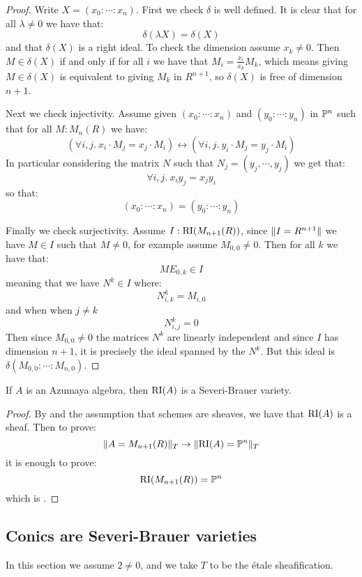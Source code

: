 \begin{proof}
Write $X=(x_0:\cdots:x_n)$. First we check $\delta$ is well defined. It is clear that for all $\lambda\not=0$ we have that:
\[\delta(\lambda X) = \delta(X)\]
and that $\delta(X)$ is a right ideal. To check the dimension assume $x_k\not=0$. Then $M\in\delta(X)$ if and only if for all $i$ we have that $M_i = \frac{x_i}{x_k} M_k$, which means giving $M\in\delta(X)$ is equivalent to giving $M_k$ in $R^{n+1}$, so $\delta(X)$ is free of dimension $n+1$.

Next we check injectivity. Assume given $(x_0:\cdots:x_n)$ and $(y_0:\cdots:y_n)$ in $\mathbb{P}^n$ such that for all $M:M_n(R)$ we have:
\[(\forall i,j.\ x_i\cdot M_j = x_j\cdot M_i) \leftrightarrow (\forall i,j.\ y_i\cdot M_j = y_j\cdot M_i)\]
In particular considering the matrix $N$ such that $N_j = (y_j,\cdots,y_j)$ we get that:
\[\forall i,j.\ x_iy_j=x_jy_i\] 
so that:
\[(x_0:\cdots:x_n) = (y_0:\cdots:y_n)\]

Finally we check surjectivity. Assume $I:\mathrm{RI}(M_{n+1}(R))$, since $\lVert I=R^{n+1} \rVert$ we have $M\in I$ such that $M\not=0$, for example assume $M_{0,0}\not=0$. Then for all $k$ we have that:
\[ME_{0,k}\in I\]
meaning that we have $N^k\in I$ where:
\[N^k_{i,k} = M_{i,0}\]
and when when $j\not=k$
\[N^k_{i,j} = 0\]
Then since $M_{0,0}\not=0$ the matrices $N^k$ are linearly independent and since $I$ has dimension $n+1$, it is precisely the ideal spanned by the $N^k$. But this ideal is $\delta(M_{0,0}:\cdots:M_{n,0})$.
\end{proof}

\begin{lemma}
If $A$ is an Azumaya algebra, then $\mathrm{RI}(A)$ is a Severi-Brauer variety.
\end{lemma}

\begin{proof}
By  and the assumption that schemes are sheaves, we have that $\mathrm{RI}(A)$ is a sheaf. Then to prove:
\[\lVert A=M_{n+1}(R) \rVert_T \to \lVert \mathrm{RI}(A)=\mathbb{P}^n \rVert_T\]
it is enough to prove:
\[\mathrm{RI}(M_{n+1}(R)) = \mathbb{P}^n\]
which is .
\end{proof}


\subsection{Conics are Severi-Brauer varieties}

In this section we assume $2\not=0$, and we take $T$ to be the étale sheafification.

